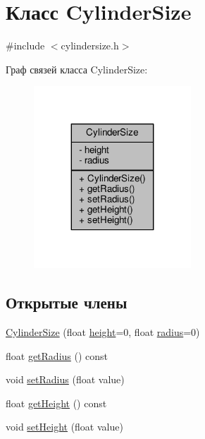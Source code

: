 \hypertarget{class_cylinder_size}{}\section{Класс Cylinder\+Size}
\label{class_cylinder_size}


{\ttfamily \#include $<$cylindersize.\+h$>$}



Граф связей класса Cylinder\+Size\+:
\nopagebreak
\begin{figure}[H]
\begin{center}
\leavevmode
\includegraphics[width=167pt]{df/db6/class_cylinder_size__coll__graph}
\end{center}
\end{figure}
\subsection*{Открытые члены}
\begin{DoxyCompactItemize}
\item 
\hyperlink{class_cylinder_size_a9896a88f9cf7b392a72e79d913b7c241}{Cylinder\+Size} (float \hyperlink{class_cylinder_size_a64a31d3ecef008bc999f02797aa73ebf}{height}=0, float \hyperlink{class_cylinder_size_ac12aa459995c8467cf96d978b05e7ee5}{radius}=0)
\item 
float \hyperlink{class_cylinder_size_a69dbd81e8e5bda6a9efb6d0dd621dac4}{get\+Radius} () const 
\item 
void \hyperlink{class_cylinder_size_a7598cedd43027dfaea97ad273180ed63}{set\+Radius} (float value)
\item 
float \hyperlink{class_cylinder_size_aac6bbbc1e12cb65d0ca299eda89f43f0}{get\+Height} () const 
\item 
void \hyperlink{class_cylinder_size_afad35daeb0ed7d9c3b132a23de7412c0}{set\+Height} (float value)
\end{DoxyCompactItemize}
